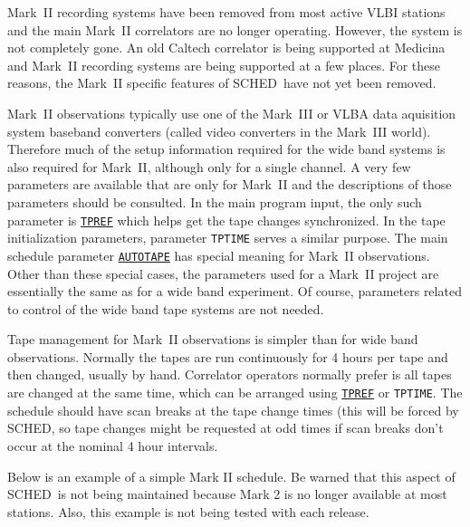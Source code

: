 \documentclass{report}
\newcommand{\sched}{{\sc SCHED}}
\newcommand{\schedb}{{\sc SCHED~}}
\begin{document}
Mark~II recording systems have been removed from most
active VLBI stations and the main Mark~II correlators are no longer
operating.  However, the system is not completely gone.  An old
Caltech correlator is being supported at Medicina and Mark~II
recording systems are being supported at a few places.  For these
reasons, the Mark~II specific features of \schedb have not
yet been removed.

Mark~II observations typically use one of the Mark~III or VLBA data
aquisition system baseband converters (called video converters in the
Mark~III world).  Therefore much of the setup information required
for the wide band systems is also required for Mark~II, although
only for a single channel.  A very few parameters are available that
are only for Mark~II and the descriptions of those parameters should
be consulted.  In the main program input, the only such parameter
is 
{\hyperref[MP:TPREF]{{\tt TPREF}}} which helps get the tape changes
synchronized.  In the tape initialization parameters, parameter
{\tt TPTIME} serves a similar purpose.  The main schedule parameter
{\hyperref[MP:AUTOTAPE]{{\tt AUTOTAPE}}} has special meaning for
Mark~II observations.  Other than these special cases, the parameters
used for a Mark~II project are essentially the same as for a wide
band experiment.  Of course, parameters related to control of the
wide band tape systems are not needed.

Tape management for Mark~II observations is simpler than for wide
band observations.  Normally the tapes are run continuously for
4 hours per tape and then changed, usually by hand.  Correlator
operators normally prefer is all tapes are changed at the same
time, which can be arranged using 
{\hyperref[MP:TPREF]{{\tt TPREF}}}
or {\tt TPTIME}.  The schedule should have scan breaks at the
tape change times (this will be forced by \sched, so tape
changes might be requested at odd times if scan breaks don't occur
at the nominal 4 hour intervals.

\newpage

Below is an example of a simple Mark II schedule.
Be warned that this aspect of \schedb is not being maintained
because Mark 2 is no longer available at most stations.  Also,
this example is not being tested with each release.
\end{document}
